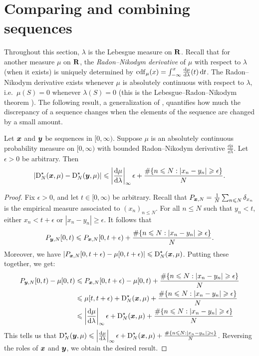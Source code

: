 \section{Comparing and combining sequences}

Throughout this section, $\lambda$ is the Lebesgue measure on $\mathbf{R}$. Recall 
that for another measure $\mu$ on $\mathbf{R}$, the \emph{Radon--Nikodym derivative} 
of $\mu$ with respect to $\lambda$ (when it exists) is uniquely determined by 
$\operatorname{cdf}_\mu(x) = \int_{-\infty}^x \frac{\mathrm{d}\mu}{\mathrm{d}\lambda}(t)\, \mathrm{d} t$. The 
Radon--Nikodym derivative exists whenever $\mu$ is absolutely continuous with 
respect to $\lambda$, i.e.~$\mu(S) = 0$ whenever $\lambda(S) = 0$ (this is the 
Lebesgue--Radon--Nikodym theorem \cite[Th.~3.8]{folland-1999}). The following 
result, a generalization of \cite[Ch.~2 Th.~4.1]{kuipers-niederreiter-1974}, 
quantifies how much the discrepancy of a sequence changes when the elements of 
the sequence are changed by a small amount. 

\begin{lemma}\label{lem:disc-of-two-seq}
Let ${\boldsymbol x}$ and ${\boldsymbol y}$ be sequences in $[0,\infty)$. Suppose $\mu$ is an 
absolutely continuous probability measure on $[0,\infty)$ with bounded 
Radon--Nikodym derivative $\frac{\dd \mu}{\dd\lambda}$. Let $\epsilon>0$ be 
arbitrary. Then 
\[
	\left|\operatorname{D}_N^\star({\boldsymbol x}, \mu) - \operatorname{D}_N^\star({\boldsymbol y},\mu)\right| \leqslant \left|\frac{\mathrm{d}\mu}{\mathrm{d}\lambda}\right|_\infty \epsilon + \frac{\#\{ n\leqslant N : |x_n - y_n| \geqslant \epsilon\}}{N} .
\]
\end{lemma}
\begin{proof}
Fix $\epsilon>0$, and let $t\in [0,\infty)$ be arbitrary. Recall that 
$P_{{\boldsymbol x},N} = \frac 1 N \sum_{n\leqslant N} \delta_{x_n}$ is the empirical 
measure associated to $(x_n)_{n\leqslant N}$. For all $n\leqslant N$ such that 
$y_n<t$, either $x_n < t+\epsilon$ or $|x_n - y_n| \geqslant \epsilon$. It 
follows that 
\[
	P_{{\boldsymbol y},N}[0,t) \leqslant P_{{\boldsymbol x},N}[0,t+\epsilon) + \frac{\#\{ n\leqslant N : |x_n - y_n| \geqslant \epsilon\}}{N} .
\]
Moreover, we have 
$\left| P_{{\boldsymbol x},N}[0,t+\epsilon) - \mu[0,t+\epsilon)\right| \leqslant \operatorname{D}_N^\star({\boldsymbol x},\mu)$. Putting these together, we get: 
\begin{align*}
	P_{{\boldsymbol y},N}[0,t) - \mu[0,t) 
		&\leqslant P_{{\boldsymbol x},N}[0,t+\epsilon) - \mu[0,t) + \frac{\#\{ n\leqslant N : |x_n - y_n| \geqslant \epsilon\}}{N} \\
		&\leqslant \mu[t,t+\epsilon) + \operatorname{D}_N^\star({\boldsymbol x},\mu) + \frac{\#\{ n\leqslant N : |x_n - y_n| \geqslant \epsilon\}}{N} \\
		&\leqslant \left|\frac{\mathrm{d}\mu}{\mathrm{d}\lambda}\right|_\infty \epsilon + \operatorname{D}_N^\star({\boldsymbol x},\mu) + \frac{\#\{ n\leqslant N : |x_n - y_n| \geqslant \epsilon\}}{N} 
\end{align*}
This tells us that 
$\operatorname{D}_N^\star({\boldsymbol y},\mu) \leqslant \left|\frac{\mathrm{d}\mu}{\mathrm{d}\lambda}\right|_\infty \epsilon + \operatorname{D}_N^\star({\boldsymbol x},\mu) + \frac{\#\{ n\leqslant N : |x_n - y_n| \geqslant \epsilon\}}{N}$. 
Reversing the roles of ${\boldsymbol x}$ and ${\boldsymbol y}$, we obtain the desired result. 
\end{proof}

